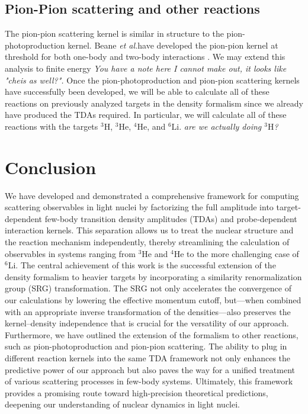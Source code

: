 \documentclass[a4paper,11pt]{article}
\newcommand{\etal}{\textit{et al.}}
\newcommand{\LiS}{{}^{6} \mathrm{Li} }
\newcommand{\HeF}{{}^{4} \mathrm{He}}
\newcommand{\HeT}{{}^{3} \mathrm{He}}
\newcommand{\HThree}{{}^{3} \mathrm{H}}
\newcommand{\ques}[1]{\color{red}\textit{ #1 }\color{black}}
\begin{document}
\subsection{Pion-Pion scattering and other reactions}
The pion-pion scattering kernel is similar in structure to the pion-photoproduction kernel.
Beane \etal have developed the pion-pion kernel at threshold for both one-body and two-body interactions \cite{Beane2003}.
We may extend this analysis to finite energy\ques{You have a note here I cannot make out, it looks like "cheis as well?".} 
Once the pion-photoproduction and pion-pion scattering kernels have successfully been developed, we will be able to calculate all of these reactions on previously analyzed targets in the density formalism since we already have produced the TDAs required.
In particular, we will calculate all of these reactions with the targets $\HThree$, $\HeT$, $\HeF$, and $\LiS$.\ques{are we actually doing $\HThree$?} 
\section{Conclusion}
We have developed and demonstrated a comprehensive framework for computing scattering observables in light nuclei by factorizing the full amplitude into target‐dependent few-body transition density amplitudes (TDAs) and probe‐dependent interaction kernels.
This separation allows us to treat the nuclear structure and the reaction mechanism independently, thereby streamlining the calculation of observables in systems ranging from $^3$He and $^4$He to the more challenging case of $^6$Li.
The central achievement of this work is the successful extension of the density formalism to heavier targets by incorporating a similarity renormalization group (SRG) transformation.
The SRG not only accelerates the convergence of our calculations by lowering the effective momentum cutoff, but—when combined with an appropriate inverse transformation of the densities—also preserves the kernel–density independence that is crucial for the versatility of our approach.
Furthermore, we have outlined the extension of the formalism to other reactions, such as pion-photoproduction and pion-pion scattering. The ability to plug in different reaction kernels into the same TDA framework not only enhances the predictive power of our approach but also paves the way for a unified treatment of various scattering processes in few-body systems.
 Ultimately, this framework provides a promising route toward high-precision theoretical predictions, deepening our understanding of nuclear dynamics in light nuclei.
\end{document}
